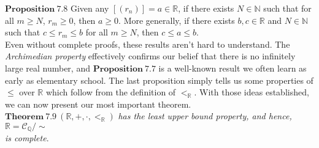 \documentclass[12pt]{article}
\theoremstyle{definition}
\theoremstyle{remark}
\begin{document}
\noindent $\mathbf{Proposition\  7.8}$ Given any $[(r_n)]=a\in\mathbb{R}$, if there exists $N\in\mathbb{N}$ such that for all $m\geq N$, $r_m\geq 0$, then $a\geq 0$. More generally, if there exists $b,c\in\mathbb{R}$ and $N\in\mathbb{N}$ such that  $c\leq r_m\leq b$ for all $m\geq N$, then $c\leq a\leq b$.\\

\noindent Even without complete proofs, these results aren't hard to understand. The \textit{Archimedian property} effectively confirms our belief that there is no infinitely large real number, and $\mathbf{Proposition\ 7.7}$ is a well-known result we often learn as early as elementary school. The last proposition simply tells us some properties of $\leq$ over $\mathbb{R}$ which follow from the definition of $<_\mathbb{R}$. With those ideas established, we can now present our most important theorem.\\

\noindent $\mathbf{Theorem\ 7.9}\ (\mathbb{R},+,\cdot,<_\mathbb{R})$ \textit{has the least upper bound property, and hence, $\mathbb{R}=\mathscr{C}_\mathbb{Q}/\sim$\\ is complete}.\\
\end{document}
